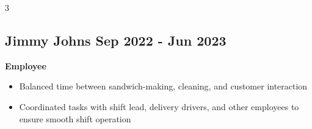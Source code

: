 \documentclass{article}
\newcommand{\dateto}[1]{
\normalsize
\textnormal{\hfill#1}}%
\begin{document}
\begin{paracol}{3}
\begin{tcolorbox}[colback=white, left=0.5in, right =0.5in, top=0.1in, breakable, colframe=white]
    \subsection*{Jimmy Johns {}\dateto{Sep 2022 - Jun 2023}}
    \textbf{Employee}
    \begin{itemize}
        \item Balanced time between sandwich-making, cleaning, and customer interaction 
        \item Coordinated tasks with shift lead, delivery drivers, and other employees to ensure smooth shift operation
    \end{itemize}
    
    
    
\end{tcolorbox}

    
\end{paracol}
\end{document}
